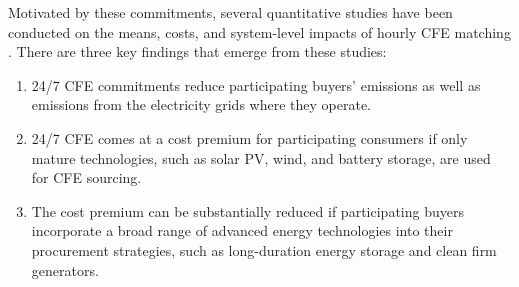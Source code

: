 \documentclass[pdflatex,sn-basic, Numbered]{sn-jnl}
\theoremstyle{thmstyleone}%
\theoremstyle{thmstyletwo}%
\theoremstyle{thmstylethree}%
\begin{document}
Motivated by these commitments, several quantitative studies have been conducted on the means, costs, and system-level impacts of hourly CFE matching \cite{xu-247CFE-report, riepinMeansCostsSystemlevel2024}. There are three key findings that emerge from these studies:
\begin{enumerate}
    \item 24/7 CFE commitments reduce participating buyers' emissions as well as emissions from the electricity grids where they operate.
    \item 24/7 CFE comes at a cost premium for participating consumers if only mature technologies, such as solar PV, wind, and battery storage, are used for CFE sourcing.
    \item The cost premium can be substantially reduced if participating buyers incorporate a broad range of advanced energy technologies into their procurement strategies, such as long-duration energy storage and clean firm generators.
\end{enumerate}
\end{document}
